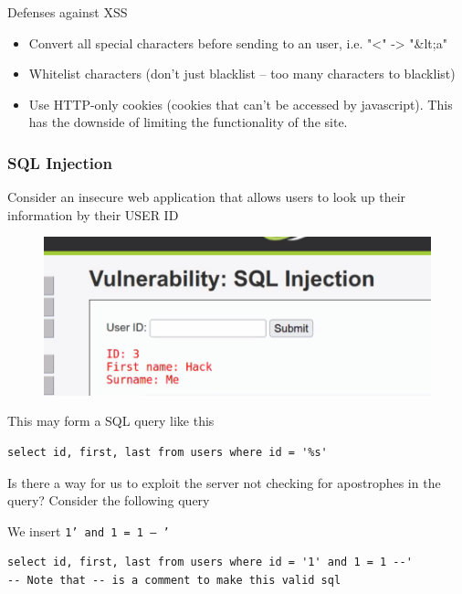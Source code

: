 \documentclass[../notes.tex]{subfiles}
\begin{document}
Defenses against XSS

\begin{itemize}
    \item Convert all special characters before sending to an user, i.e. "<" -> "\&lt;a"
    \item Whitelist characters (don't just blacklist -- too many characters to blacklist)
    \item Use HTTP-only cookies (cookies that can't be accessed by javascript). This has the downside of limiting the functionality of the site.
\end{itemize}



\subsubsection{SQL Injection}
Consider an insecure web application that allows users to look up their information by their USER ID
\begin{figure}[H]
    \centering
    \includegraphics[width=0.8\linewidth]{img/image_2023-03-13-18-49-22.png}
\end{figure}

This may form a SQL query like this

\begin{listing}[H]
\begin{verbatim}
select id, first, last from users where id = '%s'
\end{verbatim}
\end{listing}

Is there a way for us to exploit the server not checking for apostrophes in the query? Consider the following query


We insert \texttt{1' and 1 = 1 -- '}



\begin{listing}[H]
\begin{verbatim}
select id, first, last from users where id = '1' and 1 = 1 --' 
-- Note that -- is a comment to make this valid sql
\end{verbatim}
\end{listing}
\end{document}
